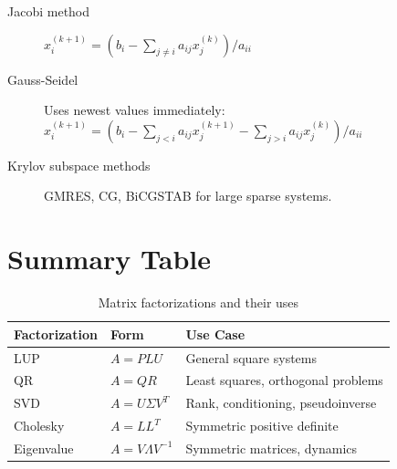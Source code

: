 \begin{description}
    \item[Jacobi method] $x_i^{(k+1)} = (b_i - \sum_{j \neq i} a_{ij}x_j^{(k)}) / a_{ii}$
    \item[Gauss-Seidel] Uses newest values immediately: $x_i^{(k+1)} = (b_i - \sum_{j < i} a_{ij}x_j^{(k+1)} - \sum_{j > i} a_{ij}x_j^{(k)}) / a_{ii}$
    \item[Krylov subspace methods] GMRES, CG, BiCGSTAB for large sparse systems.
\end{description}


\section{Summary Table}
\label{app:linalg:summary}

\begin{table}[h]
\centering
\caption{Matrix factorizations and their uses}
\begin{tabular}{lll}
\hline
\textbf{Factorization} & \textbf{Form} & \textbf{Use Case} \\
\hline
LUP & $A = PLU$ & General square systems \\
QR & $A = QR$ & Least squares, orthogonal problems \\
SVD & $A = U\Sigma V^T$ & Rank, conditioning, pseudoinverse \\
Cholesky & $A = LL^T$ & Symmetric positive definite \\
Eigenvalue & $A = V\Lambda V^{-1}$ & Symmetric matrices, dynamics \\
\hline
\end{tabular}
\end{table}


